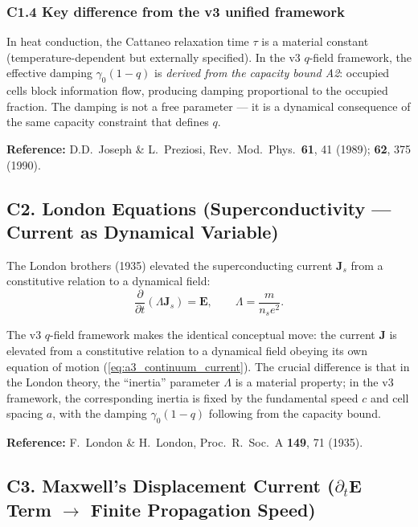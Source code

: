 \documentclass[reprint]{revtex4-2}
\begin{document}
\subsubsection{C1.4 Key difference from the v3 unified framework}

In heat conduction, the Cattaneo relaxation time $\tau$ is a material constant (temperature-dependent but externally specified). In the v3 $q$-field framework, the effective damping $\gamma_0(1-q)$ is \emph{derived from the capacity bound A2}: occupied cells block information flow, producing damping proportional to the occupied fraction. The damping is not a free parameter --- it is a dynamical consequence of the same capacity constraint that defines $q$.

\textbf{Reference:} D.D.\ Joseph \& L.\ Preziosi, Rev.\ Mod.\ Phys.\ \textbf{61}, 41 (1989); \textbf{62}, 375 (1990).

\subsection{C2. London Equations (Superconductivity --- Current as Dynamical Variable)}

The London brothers (1935) elevated the superconducting current $\mathbf{J}_s$ from a constitutive relation to a dynamical field:
\begin{equation}
\frac{\partial}{\partial t}(\Lambda\mathbf{J}_s) = \mathbf{E}, \qquad \Lambda = \frac{m}{n_s e^2}.
\end{equation}

The v3 $q$-field framework makes the identical conceptual move: the current $\mathbf{J}$ is elevated from a constitutive relation to a dynamical field obeying its own equation of motion (\ref{eq:a3_continuum_current}). The crucial difference is that in the London theory, the ``inertia'' parameter $\Lambda$ is a material property; in the v3 framework, the corresponding inertia is fixed by the fundamental speed $c$ and cell spacing $a$, with the damping $\gamma_0(1-q)$ following from the capacity bound.

\textbf{Reference:} F.\ London \& H.\ London, Proc.\ R.\ Soc.\ A \textbf{149}, 71 (1935).

\subsection{C3. Maxwell's Displacement Current ($\partial_t\mathbf{E}$ Term $\to$ Finite Propagation Speed)}
\end{document}
